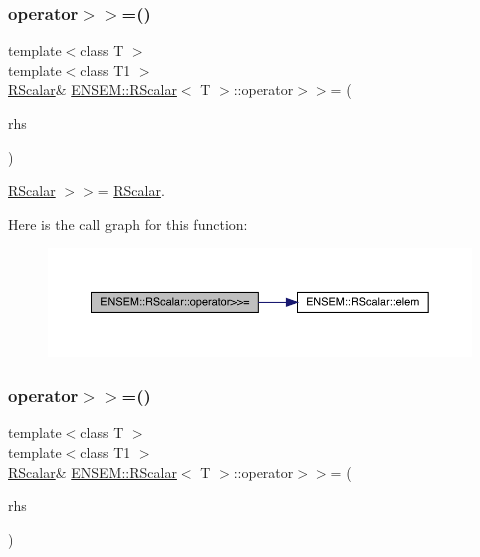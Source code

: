\subsubsection{\texorpdfstring{operator$>$$>$=()}{operator>>=()}\hspace{0.1cm}{\footnotesize\ttfamily [2/3]}}
{\footnotesize\ttfamily template$<$class T $>$ \\
template$<$class T1 $>$ \\
\mbox{\hyperlink{classENSEM_1_1RScalar}{R\+Scalar}}\& \mbox{\hyperlink{classENSEM_1_1RScalar}{E\+N\+S\+E\+M\+::\+R\+Scalar}}$<$ T $>$\+::operator$>$$>$= (\begin{DoxyParamCaption}\item[{const \mbox{\hyperlink{classENSEM_1_1RScalar}{R\+Scalar}}$<$ T1 $>$ \&}]{rhs }\end{DoxyParamCaption})\hspace{0.3cm}{\ttfamily [inline]}}



\mbox{\hyperlink{classENSEM_1_1RScalar}{R\+Scalar}} $>$$>$= \mbox{\hyperlink{classENSEM_1_1RScalar}{R\+Scalar}}. 

Here is the call graph for this function\+:
\nopagebreak
\begin{figure}[H]
\begin{center}
\leavevmode
\includegraphics[width=350pt]{d0/d8c/classENSEM_1_1RScalar_a35379cd7317c2c533aa26e3c15a9b03f_cgraph}
\end{center}
\end{figure}
\mbox{\label{classENSEM_1_1RScalar_a35379cd7317c2c533aa26e3c15a9b03f}} 
\subsubsection{\texorpdfstring{operator$>$$>$=()}{operator>>=()}\hspace{0.1cm}{\footnotesize\ttfamily [3/3]}}
{\footnotesize\ttfamily template$<$class T $>$ \\
template$<$class T1 $>$ \\
\mbox{\hyperlink{classENSEM_1_1RScalar}{R\+Scalar}}\& \mbox{\hyperlink{classENSEM_1_1RScalar}{E\+N\+S\+E\+M\+::\+R\+Scalar}}$<$ T $>$\+::operator$>$$>$= (\begin{DoxyParamCaption}\item[{const \mbox{\hyperlink{classENSEM_1_1RScalar}{R\+Scalar}}$<$ T1 $>$ \&}]{rhs }\end{DoxyParamCaption})\hspace{0.3cm}{\ttfamily [inline]}}



